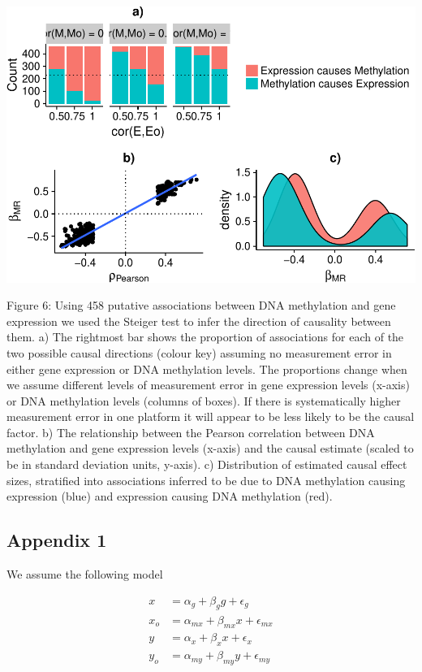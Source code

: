 \documentclass[]{article}
\begin{document}
\newpage

\includegraphics{manuscript_files/figure-latex/shakhplot-1.pdf}

Figure 6: Using 458 putative associations between DNA methylation and
gene expression we used the Steiger test to infer the direction of
causality between them. a) The rightmost bar shows the proportion of
associations for each of the two possible causal directions (colour key)
assuming no measurement error in either gene expression or DNA
methylation levels. The proportions change when we assume different
levels of measurement error in gene expression levels (x-axis) or DNA
methylation levels (columns of boxes). If there is systematically higher
measurement error in one platform it will appear to be less likely to be
the causal factor. b) The relationship between the Pearson correlation
between DNA methylation and gene expression levels (x-axis) and the
causal estimate (scaled to be in standard deviation units, y-axis). c)
Distribution of estimated causal effect sizes, stratified into
associations inferred to be due to DNA methylation causing expression
(blue) and expression causing DNA methylation (red).

\newpage

\subsection{Appendix 1}\label{appendix-1}

We assume the following model

\[
\begin{aligned}
x   & = \alpha_g + \beta_g g + \epsilon_g \\
x_o & = \alpha_{mx} + \beta_{mx} x + \epsilon_{mx} \\
y   & = \alpha_x + \beta_x x + \epsilon_x \\
y_o & = \alpha_{my} + \beta_{my} y + \epsilon_{my}
\end{aligned}
\]
\end{document}
